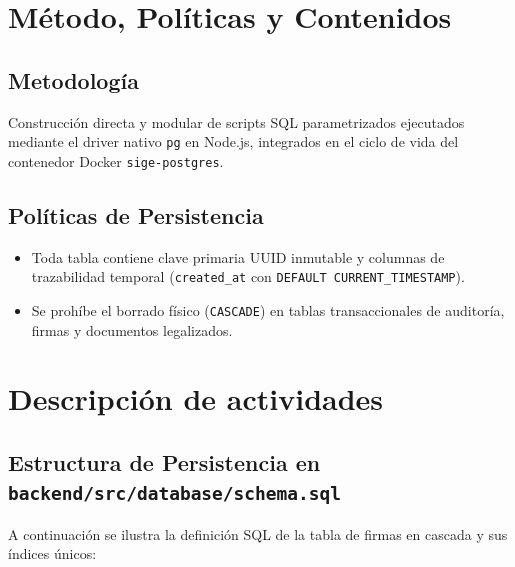 \documentclass[11pt,a4paper]{article}
\begin{document}
\section{Método, Políticas y Contenidos}

\subsection{Metodología}
Construcción directa y modular de scripts SQL parametrizados ejecutados mediante el driver nativo \texttt{pg} en Node.js, integrados en el ciclo de vida del contenedor Docker \texttt{sige-postgres}.

\subsection{Políticas de Persistencia}
\begin{itemize}[leftmargin=1.5em, itemsep=1.5pt]
    \item Toda tabla contiene clave primaria UUID inmutable y columnas de trazabilidad temporal (\texttt{created\_at} con \texttt{DEFAULT CURRENT\_TIMESTAMP}).
    \item Se prohíbe el borrado físico (\texttt{CASCADE}) en tablas transaccionales de auditoría, firmas y documentos legalizados.
\end{itemize}

\section{Descripción de actividades}

\subsection{Estructura de Persistencia en \texttt{backend/src/database/schema.sql}}
A continuación se ilustra la definición SQL de la tabla de firmas en cascada y sus índices únicos:
\end{document}
